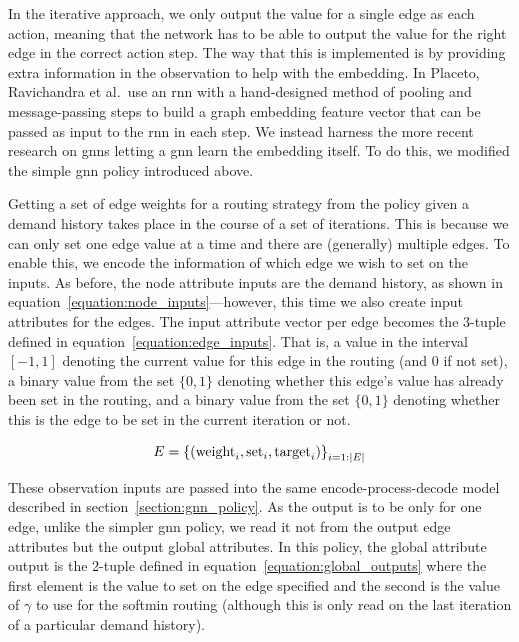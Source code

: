 In the iterative approach, we only output the value for a single edge as each action, meaning that the network has to be able to output the value for the right edge in the correct action step. The way that this is implemented is by providing extra information in the observation to help with the embedding. In Placeto, Ravichandra et al.\ use an \acf{rnn} with a hand-designed method of pooling and message-passing steps to build a graph embedding feature vector that can be passed as input to the \ac{rnn} in each step. We instead harness the more recent research on \acp{gnn} letting a \ac{gnn} learn the embedding itself. To do this, we modified the simple \ac{gnn} policy introduced above.

Getting a set of edge weights for a routing strategy from the policy given a demand history takes place in the course of a set of iterations. This is because we can only set one edge value at a time and there are (generally) multiple edges. To enable this, we encode the information of which edge we wish to set on the inputs. As before, the node attribute inputs are the demand history, as shown in equation~\ref{equation:node_inputs}---however, this time we also create input attributes for the edges. The input attribute vector per edge becomes the 3-tuple defined in equation~\ref{equation:edge_inputs}. That is, a value in the interval $[-1,1]$ denoting the current value for this edge in the routing (and 0 if not set), a binary value from the set $\{0,1\}$ denoting whether this edge's value has already been set in the routing, and a binary value from the set $\{0,1\}$ denoting whether this is the edge to be set in the current iteration or not.

\begin{equation}
  \label{equation:edge_inputs}
  E = \left\{ (\operatorname{weight}_i, \operatorname{set\vphantom{_i}}_i, \operatorname{target}_i) \right\}_{i=1:|E|}
\end{equation}

These observation inputs are passed into the same encode-process-decode model described in section~\ref{section:gnn_policy}. As the output is to be only for one edge, unlike the simpler \ac{gnn} policy, we read it not from the output edge attributes but the output global attributes. In this policy, the global attribute output is the 2-tuple defined in equation~\ref{equation:global_outputs} where the first element is the value to set on the edge specified and the second is the value of $\gamma$ to use for the softmin routing (although this is only read on the last iteration of a particular demand history).

